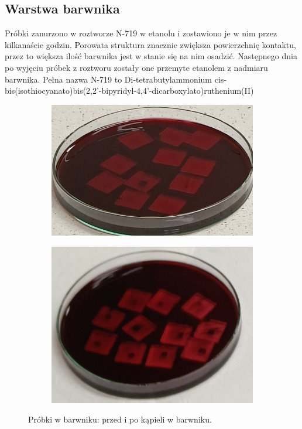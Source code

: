 \documentclass[a4, 12pt]{article}
\begin{document}
	\subsection{Warstwa barwnika}
	Próbki zanurzono w roztworze N-719 w etanolu i zostawiono je w nim przez kilkanaście godzin. Porowata struktura  znacznie zwiększa powierzchnię kontaktu, przez to większa ilość barwnika jest w stanie się na nim osadzić. Następnego dnia po wyjęciu próbek z roztworu zostały one przemyte etanolem z nadmiaru barwnika. Pełna nazwa N-719 to Di-tetrabutylammonium cis-bis(isothiocyanato)bis(2,2'-bipyridyl-4,4'-dicarboxylato)ruthenium(II)
	\begin{figure}[H]
		\centering
		\begin{subfigure}{0.45\textwidth}
			\centering
			\includegraphics[width=\textwidth]{probki_w_barwniku_przed.png}
			\caption{\label{fig:barwnik_przed}}
		\end{subfigure}
		\begin{subfigure}{0.45\textwidth}
			\includegraphics[width=\textwidth]{probki_w_barwniku_po.png}
			\caption{\label{fig:barwnik_po}}
		\end{subfigure}
		\captionsetup{subrefformat=parens}
		\caption{Próbki w barwniku:  przed i  po kąpieli w barwniku.}
	\end{figure}
	
\end{document}
